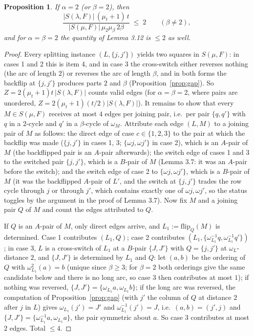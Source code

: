 \documentclass[11pt]{article}
\newtheorem{proposition}[lemma]{Proposition}
\theoremstyle{remark}
\begin{document}
\begin{proposition}\label{prop:two}
If $\alpha=2$ (or $\beta=2$), then
\[
\frac{|S(\lambda,F)|\,(\mu_{t}+1)\,t}{|S(\mu,F)|\,\mu_2\mu_\beta\,2\beta}\;\le\;2
\qquad(\beta\ne2),
\]
and for $\alpha=\beta=2$ the quantity of Lemma 3.12 is $\le2$ as well.
\end{proposition}

\begin{proof}
Every splitting instance $(L,\{j,j'\})$ yields two squares in
$S(\mu,F)$: in cases 1 and 2 this is item 4, and in case 3 the
cross-switch either reverses nothing (the arc of length $2$) or
reverses the arc of length $\beta$, and in both forms the backflip at
$\{j,j'\}$ produces parts $2$ and $\beta$ (Proposition~\ref{prop:gap}).
So $Z=2(\mu_t+1)t\,|S(\lambda,F)|$ counts valid edges (for
$\alpha=\beta=2$, where pairs are unordered, $Z=2(\mu_t+1)(t/2)|S(\lambda,F)|$).  It remains to
show that every $M\in S(\mu,F)$ receives at most $4$ edges per joining
pair, i.e.\ per pair $\{q,q'\}$ with $q$ in a $2$-cycle and $q'$ in a
$\beta$-cycle of $\omega_M$.  Attribute each edge $(L,M)$ to a joining
pair of $M$ as follows: the direct edge of case $c\in\{1,2,3\}$ to the
pair at which the backflip was made ($\{j,j'\}$ in cases 1, 3;
$\{\omega j,\omega j'\}$ in case 2), which is an $A$-pair of $M$ (the
backflipped pair is an $A$-pair afterwards); the switch edge of cases 1
and 3 to the switched pair $\{j,j'\}$, which is a $B$-pair of $M$
(Lemma 3.7: it was an $A$-pair before the switch); and the switch edge
of case 2 to $\{\omega j,\omega j'\}$, which is a $B$-pair of $M$ (it
was the backflipped $A$-pair of $L'$, and the switch at $\{j,j'\}$
trades the row cycle through $j$ or through $j'$, which contains
exactly one of $\omega j,\omega j'$, so the status toggles by the
argument in the proof of Lemma 3.7).  Now fix $M$ and a joining pair
$Q$ of $M$ and count the edges attributed to $Q$.

If $Q$ is an $A$-pair of $M$, only direct edges arrive, and
$L_1:=\mathrm{flip}_Q(M)$ is determined.  Case 1 contributes
$(L_1,Q)$; case 2 contributes $(L_1,\{\omega_{L_1}^{-1}q,\omega_{L_1}^{-1}q'\})$;
in case 3, $L$ is a cross-switch of $L_1$ at a $B$-pair $\{J,J'\}$ with
$Q=\{j,j'\}$ at $\omega_L$-distance $2$, and $\{J,J'\}$ is determined by
$L_1$ and $Q$: let $(a,b)$ be the ordering of $Q$ with
$\omega_{L_1}^2(a)=b$ (unique since $\beta\ge3$; for $\beta=2$ both
orderings give the same candidate below and there is no long arc, so
case 3 then contributes at most $1$); if nothing was
reversed, $\{J,J'\}=\{\omega_{L_1}a,\omega_{L_1}b\}$; if the long arc
was reversed, the computation of Proposition~\ref{prop:gap} (with $j'$
the column of $Q$ at distance $2$ after $j$ in $L$) gives
$\omega_{L_1}(j')=J'$ and $\omega_{L_1}^{-1}(j')=J$, i.e.\ $(a,b)=(j',j)$
and $\{J,J'\}=\{\omega_{L_1}^{-1}a,\omega_{L_1}a\}$, the pair symmetric
about $a$.  So case 3 contributes at most $2$ edges.  Total $\le4$.


\end{proof}
\end{document}
